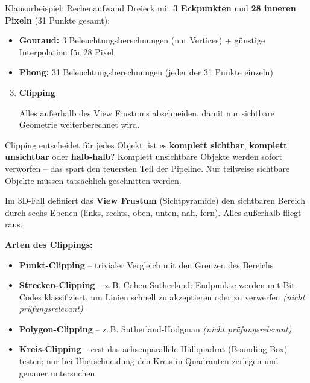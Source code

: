 \documentclass[12pt, a4paper]{article}
\begin{document}
\begin{examplebox}{Klausurbeispiel: Rechenaufwand}
Dreieck mit \textbf{3 Eckpunkten} und \textbf{28 inneren Pixeln} (31 Punkte gesamt):
\begin{itemize}
  \item \textbf{Gouraud:} 3 Beleuchtungsberechnungen (nur Vertices) $+$ günstige Interpolation für 28 Pixel
  \item \textbf{Phong:} 31 Beleuchtungsberechnungen (jeder der 31 Punkte einzeln)
\end{itemize}
\end{examplebox}


\begin{enumerate}
  \setcounter{enumi}{2}

  \item \textbf{Clipping}

  Alles außerhalb des View Frustums abschneiden, damit nur sichtbare Geometrie weiterberechnet wird.

\end{enumerate}


Clipping entscheidet für jedes Objekt: ist es \textbf{komplett sichtbar}, \textbf{komplett unsichtbar} oder \textbf{halb-halb}? Komplett unsichtbare Objekte werden sofort verworfen -- das spart den teuersten Teil der Pipeline. Nur teilweise sichtbare Objekte müssen tatsächlich geschnitten werden.

Im 3D-Fall definiert das \textbf{View Frustum} (Sichtpyramide) den sichtbaren Bereich durch sechs Ebenen (links, rechts, oben, unten, nah, fern). Alles außerhalb fliegt raus.

\textbf{Arten des Clippings:}
\begin{itemize}
  \item \textbf{Punkt-Clipping} -- trivialer Vergleich mit den Grenzen des Bereichs
  \item \textbf{Strecken-Clipping} -- z.\,B. Cohen-Sutherland: Endpunkte werden mit Bit-Codes klassifiziert, um Linien schnell zu akzeptieren oder zu verwerfen \textit{(nicht prüfungsrelevant)}
  \item \textbf{Polygon-Clipping} -- z.\,B. Sutherland-Hodgman \textit{(nicht prüfungsrelevant)}
  \item \textbf{Kreis-Clipping} -- erst das achsenparallele Hüllquadrat (Bounding Box) testen; nur bei Überschneidung den Kreis in Quadranten zerlegen und genauer untersuchen
\end{itemize}
\end{document}
